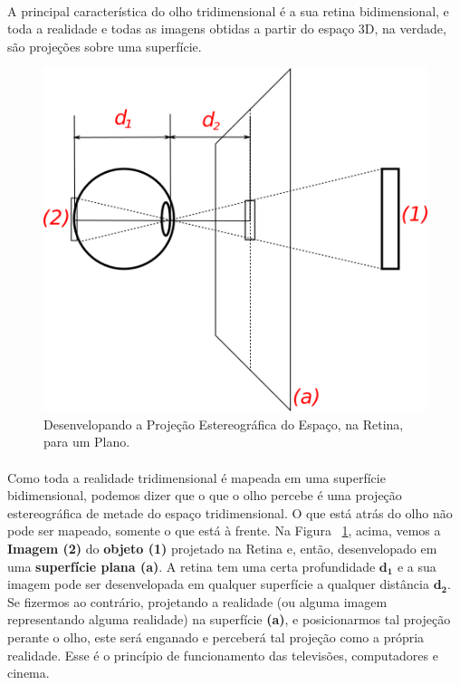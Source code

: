 \documentclass{article}
\begin{document}
	\paragraph{}
	A principal característica do olho tridimensional é a sua retina bidimensional, e toda a realidade e todas as imagens obtidas a partir do espaço 3D, na verdade, são projeções sobre uma superfície.
	
	\begin{figure}[h]
		\centering
		\includegraphics[scale=0.7]{Desenvelope-Da-Retina}
		\caption{Desenvelopando a Projeção Estereográfica do Espaço, na Retina, para um Plano.}
		\label{fig:DesenvelopeRetina3D}
	\end{figure}
	
	\paragraph{}
	Como toda a realidade tridimensional é mapeada em uma superfície bidimensional, podemos dizer que o que o olho percebe é uma projeção estereográfica de metade do espaço tridimensional. O que está atrás do olho não pode ser mapeado, somente o que está à frente. Na Figura ~\ref{fig:DesenvelopeRetina3D}, acima, vemos a \textbf{Imagem (2)} do \textbf{objeto (1)} projetado na Retina e, então, desenvelopado em uma \textbf{superfície plana (a)}. A retina tem uma certa profundidade $\boldsymbol{d_1}$ e a sua imagem pode ser desenvelopada em qualquer superfície a qualquer distância $\boldsymbol{d_2}$. Se fizermos ao contrário, projetando a realidade (ou alguma imagem representando alguma realidade) na superfície \textbf{(a)}, e posicionarmos tal projeção perante o olho, este será enganado e perceberá tal projeção como a própria realidade. Esse é o princípio de funcionamento das televisões, computadores e cinema.
	
\end{document}
